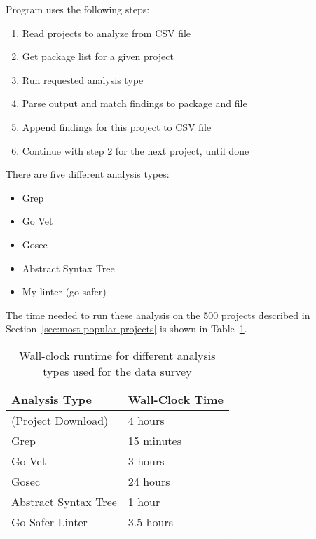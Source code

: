 Program uses the following steps:

\begin{enumerate}
    \item Read projects to analyze from CSV file
    \item Get package list for a given project
    \item Run requested analysis type
    \item Parse output and match findings to package and file
    \item Append findings for this project to CSV file
    \item Continue with step 2 for the next project, until done
\end{enumerate}

There are five different analysis types:

\begin{itemize}
    \item Grep
    \item Go Vet
    \item Gosec
    \item Abstract Syntax Tree
    \item My linter (go-safer)
\end{itemize}

The time needed to run these analysis on the 500 projects described in Section~\ref{sec:most-popular-projects} is shown
in Table~\ref{tbl:survey-analysis-wallclocktime}.

\begin{table}[h]
    \centering
    \caption{Wall-clock runtime for different analysis types used for the data survey}
    \label{tbl:survey-analysis-wallclocktime}
    \begin{tabular}{ll}
        \toprule
        Analysis Type & Wall-Clock Time \\
        \midrule
        (Project Download) & 4 hours \\
        Grep & 15 minutes \\
        Go Vet & 3 hours \\
        Gosec & 24 hours \\
        Abstract Syntax Tree & 1 hour \\
        Go-Safer Linter & 3.5 hours \\
        \bottomrule
    \end{tabular}
\end{table}



